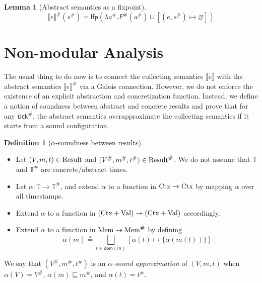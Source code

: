 \documentclass[acmsmall,screen,review]{acmart}
\theoremstyle{definition}
\newtheorem{definition}{Definition}[section]
\newtheorem{lem}{Lemma}[section]
\newcommand*{\A}[1]{{#1}^{\#}}
\newcommand*{\Time}{\mathbb{T}}
\newcommand*{\ATime}{\A{\Time}}
\newcommand*{\Ctx}[1]{\text{Ctx}\vphantom{#1}}
\newcommand*{\Value}[1]{\text{Val}\vphantom{#1}}
\newcommand*{\Mem}[1]{\text{Mem}\vphantom{#1}}
\newcommand*{\mem}{m}
\newcommand*{\AMem}[1]{\A{\text{Mem}}\vphantom{#1}}
\newcommand*{\Result}[1]{\text{Result}\vphantom{#1}}
\newcommand*{\AResult}[1]{\A{\text{Result}}\vphantom{#1}}
\newcommand*{\sembracket}[1]{\lBrack{#1}\rBrack}
\newcommand*{\tick}{\mathsf{tick}}
\begin{document}
\begin{lem}[Abstract semantics as a fixpoint]
  \[
    \A{\sembracket{e}}(\A{s})=\mathsf{lfp}(\lambda \A{a}.\A{F}(\A{a})\sqcup[(e,\A{s})\mapsto\varnothing])
  \]
\end{lem}

\section{Non-modular Analysis}
The usual thing to do now is to connect the collecting semantics $\sembracket{e}$ with the abstract semantics $\A{\sembracket{e}}$ via a Galois connection.
However, we do not enforce the existence of an explicit abstraction and concretization function.
Instead, we define a notion of soundness between abstract and concrete results and prove that for any $\A{\tick}$, the abstract semantics overapproximate the collecting semantics if it starts from a sound configuration.

\begin{definition}[$\alpha$-soundness between results]
  $\:$

  \begin{itemize}
    \item Let $(V,\mem,t)\in\Result{\Time}$ and $(\A{V},\A\mem,\A{t})\in\AResult{\ATime}$. We do not assume that $\Time$ and $\ATime$ are concrete/abstract times.
    \item Let $\alpha:\Time\rightarrow\ATime$, and extend $\alpha$ to a function in $\Ctx{\Time}\rightarrow\Ctx{\ATime}$ by mapping $\alpha$ over all timestamps.
    \item Extend $\alpha$ to a function in $(\Ctx{\Time}+\Value{\Time})\rightarrow(\Ctx{\ATime}+\Value{\ATime})$ accordingly.
    \item Extend $\alpha$ to a function in $\Mem{\Time}\rightarrow\AMem{\ATime}$ by defining
          \[\alpha(\mem)\triangleq\bigsqcup_{t\in\mathsf{dom}(\mem)}[\alpha(t)\mapsto\{\alpha(\mem(t))\}]\]
  \end{itemize}

  We say that $(\A{V},\A\mem,\A{t})$ is an \emph{$\alpha$-sound approximation} of $(V,\mem,t)$ when $\alpha(V)=\A{V}$, $\alpha(\mem)\sqsubseteq\A\mem$, and $\alpha(t)=\A{t}$.
\end{definition}
\end{document}
